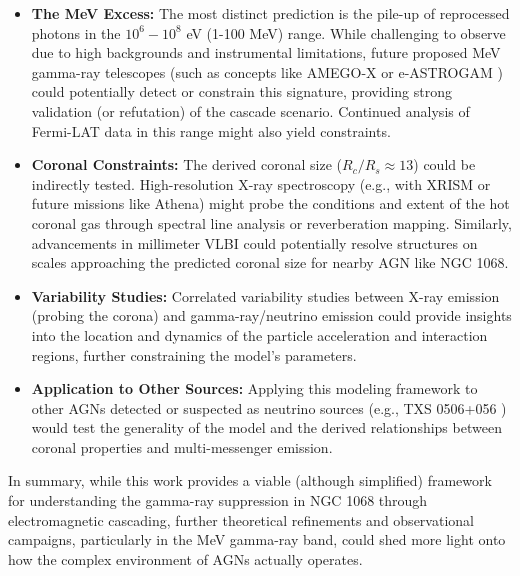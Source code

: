 \begin{itemize}
    \item \textbf{The MeV Excess:} The most distinct prediction is the pile-up of reprocessed photons in the $10^6 - 10^8$ eV (1-100 MeV) range. While challenging to observe due to high backgrounds and instrumental limitations, future proposed MeV gamma-ray telescopes (such as concepts like AMEGO-X \citep{segarro} or e-ASTROGAM \citep{astrogramillos}) could potentially detect or constrain this signature, providing strong validation (or refutation) of the cascade scenario. Continued analysis of Fermi-LAT data in this range might also yield constraints.
    \item \textbf{Coronal Constraints:} The derived coronal size ($R_c/R_s \approx 13$) could be indirectly tested. High-resolution X-ray spectroscopy (e.g., with XRISM or future missions like Athena) might probe the conditions and extent of the hot coronal gas through spectral line analysis or reverberation mapping. Similarly, advancements in millimeter VLBI could potentially resolve structures on scales approaching the predicted coronal size for nearby AGN like NGC 1068.
    \item \textbf{Variability Studies:} Correlated variability studies between X-ray emission (probing the corona) and gamma-ray/neutrino emission could provide insights into the location and dynamics of the particle acceleration and interaction regions, further constraining the model's parameters.
    \item \textbf{Application to Other Sources:} Applying this modeling framework to other AGNs detected or suspected as neutrino sources (e.g., TXS 0506+056 \citep{2018p}) would test the generality of the model and the derived relationships between coronal properties and multi-messenger emission.
\end{itemize}

In summary, while this work provides a viable (although simplified) framework for understanding the gamma-ray suppression in NGC 1068 through electromagnetic cascading, further theoretical refinements and observational campaigns, particularly in the MeV gamma-ray band, could shed more light onto how the complex environment of AGNs actually operates.

